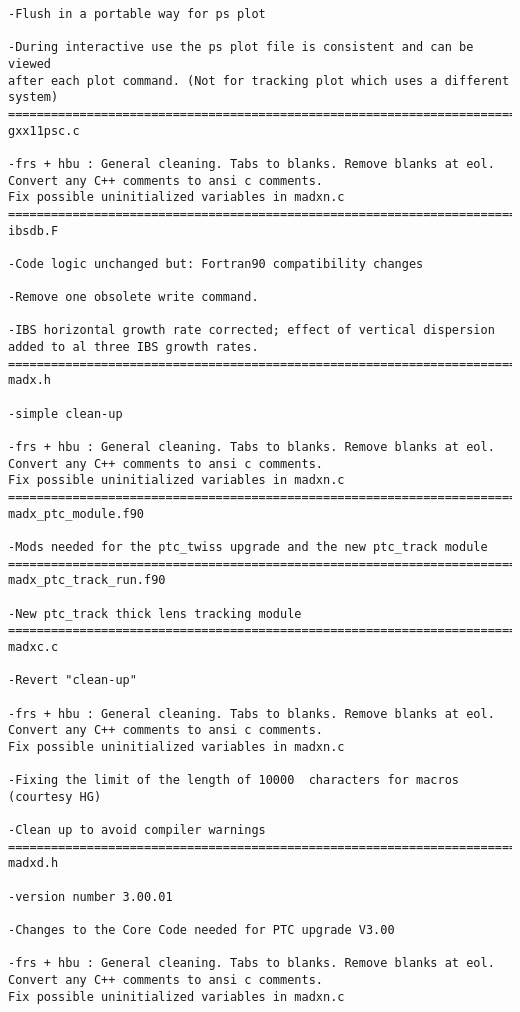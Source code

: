 \begin{verbatim}
-Flush in a portable way for ps plot

-During interactive use the ps plot file is consistent and can be viewed 
after each plot command. (Not for tracking plot which uses a different system)
=============================================================================
gxx11psc.c

-frs + hbu : General cleaning. Tabs to blanks. Remove blanks at eol.
Convert any C++ comments to ansi c comments.
Fix possible uninitialized variables in madxn.c
=============================================================================
ibsdb.F

-Code logic unchanged but: Fortran90 compatibility changes

-Remove one obsolete write command.

-IBS horizontal growth rate corrected; effect of vertical dispersion added to al three IBS growth rates.
=============================================================================
madx.h

-simple clean-up

-frs + hbu : General cleaning. Tabs to blanks. Remove blanks at eol.
Convert any C++ comments to ansi c comments.
Fix possible uninitialized variables in madxn.c
=============================================================================
madx_ptc_module.f90

-Mods needed for the ptc_twiss upgrade and the new ptc_track module
=============================================================================
madx_ptc_track_run.f90

-New ptc_track thick lens tracking module
=============================================================================
madxc.c

-Revert "clean-up"

-frs + hbu : General cleaning. Tabs to blanks. Remove blanks at eol.
Convert any C++ comments to ansi c comments.
Fix possible uninitialized variables in madxn.c

-Fixing the limit of the length of 10000  characters for macros (courtesy HG)

-Clean up to avoid compiler warnings
=============================================================================
madxd.h

-version number 3.00.01

-Changes to the Core Code needed for PTC upgrade V3.00

-frs + hbu : General cleaning. Tabs to blanks. Remove blanks at eol.
Convert any C++ comments to ansi c comments.
Fix possible uninitialized variables in madxn.c


\end{verbatim}
